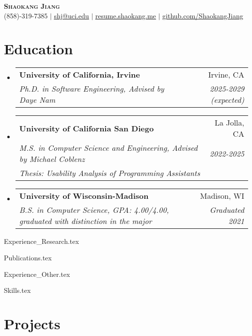 \documentclass[letterpaper,11pt]{article}
\makeatletter
\newcommand{\resumeSubheading}[4]{
  \vspace{-2pt}\item
    \begin{tabular*}{0.97\textwidth}[t]{l@{\extracolsep{\fill}}r}
      \textbf{#1} & #2 \\
      \textit{\small#3} & \textit{\small #4} \\
    \end{tabular*}\vspace{-7pt}
}
\newcommand{\resumeSubheadingtwo}[6]{
  \vspace{-2pt}\item
    \begin{tabular*}{0.97\textwidth}[t]{l@{\extracolsep{\fill}}r}
      \textbf{#1} & #2 \\
      \textit{\small #3} & \textit{\small #4} \\
      \textit{\small #5} & \textit{\small #6} \\
    \end{tabular*}\vspace{-7pt}
}
\newcommand{\resumeSubHeadingListStart}{\begin{itemize}[leftmargin=0.12in, label={}]}
\newcommand{\resumeSubHeadingListEnd}{\end{itemize}}
\makeatother
\begin{document}

\begin{center}
    \textbf{\Huge \scshape Shaokang Jiang} \\ \vspace{1pt}
    \small (858)-319-7385 $|$ \href{mailto:shj@uci.edu}{\underline{shj@uci.edu}} $|$ 
    \href{https://resume.shaokang.me}{\underline{resume.shaokang.me}} $|$
    \href{https://github.com/ShaokangJiang}{\underline{github.com/ShaokangJiang}}
\end{center}


\section{Education}
  \resumeSubHeadingListStart
      \resumeSubheading
      {University of California, Irvine}{Irvine, CA}
      {Ph.D. in Software Engineering, Advised by Daye Nam}{2025-2029 (expected)}
    \resumeSubheadingtwo
      {University of California San Diego}{La Jolla, CA}
      {M.S. in Computer Science and Engineering, Advised by Michael Coblenz}{2022-2025}
      {Thesis: Usability Analysis of Programming Assistants}{}
      \resumeSubheading
      {University of Wisconsin-Madison}{Madison, WI}
      {B.S. in Computer Science, GPA: 4.00/4.00, graduated with distinction in the major}{Graduated 2021}
  \resumeSubHeadingListEnd


  
{Experience_Research.tex}

% 
{Publications.tex}



{Experience_Other.tex}

%
{Skills.tex}

\section{Projects}
\end{document}
